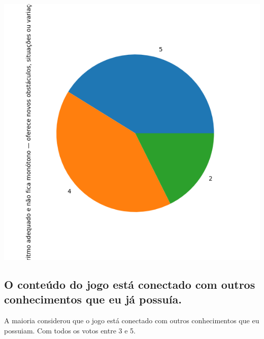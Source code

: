 \documentclass[12pt]{article}
\begin{document}
\begin{center}
  \includegraphics[scale=0.4]{O jogo evolui num ritmo adequado e não fica monótono — oferece novos obstáculos, situações ou variações de atividades..png}
\end{center}


\subsection{O conteúdo do jogo está conectado com outros conhecimentos que eu já possuía.}

A maioria considerou que o jogo está conectado com outros conhecimentos que eu possuiam. Com todos os votos entre 3 e 5.
\end{document}
